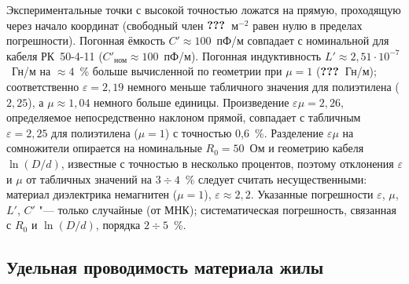 \documentclass[a4paper,12pt]{article}
\makeatletter
\newcommand{\qq}{\textbf{???}}
\newcommand{\res}[1]{%
    \ifcsname res@#1\endcsname\csname res@#1\endcsname\else\qq\fi}
\makeatother
\begin{document}
Экспериментальные точки с высокой точностью ложатся на прямую,
проходящую через начало координат (свободный член
$\res{b1}$~м$^{-2}$ равен нулю в пределах погрешности). Погонная
ёмкость $C'\approx100$~пФ/м совпадает с номинальной для кабеля
РК~50-4-11 ($C'_\text{ном}\approx100$~пФ/м). Погонная индуктивность
$L'\approx2{,}51\cdot10^{-7}$~Гн/м на $\approx4$~\% больше вычисленной
по геометрии при $\mu = 1$ ($\res{LxNom}$~Гн/м); соответственно
$\varepsilon = 2{,}19$ немного меньше табличного значения для
полиэтилена ($2{,}25$), а $\mu\approx1{,}04$ немного больше единицы.
Произведение $\varepsilon\mu = 2{,}26$, определяемое непосредственно
наклоном прямой, совпадает с табличным $\varepsilon = 2{,}25$ для
полиэтилена ($\mu = 1$) с точностью 0,6~\%. Разделение $\varepsilon\mu$ на
сомножители опирается на номинальные $R_0 = 50$~Ом и геометрию кабеля
$\ln(D/d)$, известные с точностью в несколько процентов, поэтому
отклонения $\varepsilon$ и $\mu$ от табличных значений на $3\div4$~\%
следует считать несущественными: материал диэлектрика немагнитен
($\mu = 1$), $\varepsilon\approx2{,}2$. Указанные погрешности
$\varepsilon$, $\mu$, $L'$, $C'$ "--- только случайные (от МНК);
систематическая погрешность, связанная с $R_0$ и $\ln(D/d)$, порядка
$2\div5$~\%.

\subsection{Удельная проводимость материала жилы}
\end{document}
